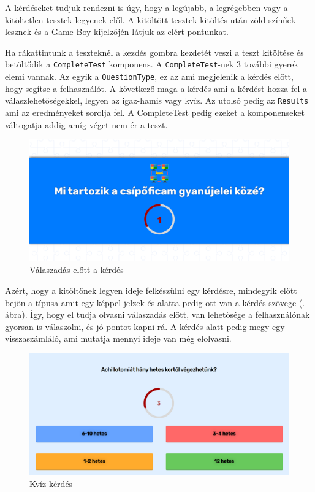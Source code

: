 A kérdéseket tudjuk rendezni is úgy, hogy a legújabb, a legrégebben vagy a kitöltetlen tesztek legyenek elől.
A kitöltött tesztek kitöltés után zöld színűek lesznek és a Game Boy kijelzőjén látjuk az elért pontunkat.


Ha rákattintunk a teszteknél a kezdés gombra kezdetét veszi a teszt kitöltése és betöltődik a \texttt{CompleteTest} komponens. A \texttt{CompleteTest}-nek 3 további gyerek elemi vannak. Az egyik a \texttt{QuestionType}, ez az ami megjelenik a kérdés előtt, hogy segítse a felhasználót. A következő maga a kérdés ami a kérdést hozza fel a válaszlehetőségekkel, legyen az igaz-hamis vagy kvíz. Az utolsó pedig az \texttt{Results} ami az eredményeket sorolja fel. A CompleteTest pedig ezeket a komponenseket váltogatja addig amíg véget nem ér a teszt.

\begin{figure}[H]
    \centering
    \includegraphics[width=\linewidth]{images/question_type.png}
    \caption{Válaszadás előtt a kérdés}
    \label{fig:question_type}
\end{figure}

Azért, hogy a kitöltőnek legyen ideje felkészülni egy kérdésre, mindegyik előtt bejön a típusa amit egy képpel jelzek és alatta pedig ott van a kérdés szövege (. ábra). Így, hogy el tudja olvasni válaszadás előtt, van lehetősége a felhasználónak gyorsan is válaszolni, és jó pontot kapni rá. A kérdés alatt pedig megy egy visszaszámláló, ami mutatja mennyi ideje van még elolvasni.

\begin{figure}[H]
    \centering
    \includegraphics[width=\linewidth]{images/question1.png}
    \caption{Kvíz kérdés}
    \label{fig:question1}
\end{figure}

